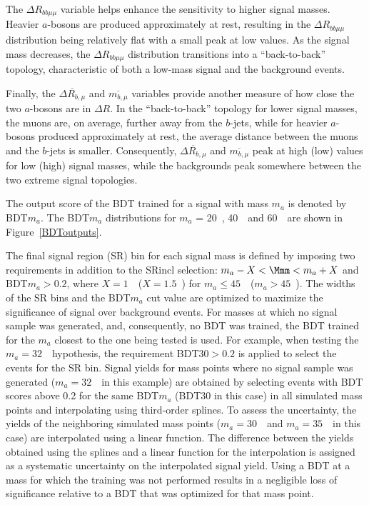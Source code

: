 \documentclass[cernpreprint, backref=false, texlive=2020, UKenglish, dvipsnames, block=none, texmf]{atlasdoc}
\begin{document}
 
The $\Delta R_{bb\mu\mu}$ variable helps enhance the sensitivity to higher signal masses. Heavier $a$-bosons are produced approximately at rest, resulting in the $\Delta R_{bb\mu\mu}$ distribution being relatively flat with a small peak at low values. As the signal mass decreases, the $\Delta R_{bb\mu\mu}$ distribution  transitions into a ``back-to-back'' topology, characteristic of both a low-mass signal and the background events.
 
 
Finally, the $\overline{\Delta R_{b,\mu}}$ and $\overline{m_{b,\mu}}$ variables provide another measure of how close the two $a$-bosons are in $\Delta R$.
In the ``back-to-back'' topology for lower signal masses, the muons are, on average, further away from the $b$-jets, while for heavier $a$-bosons produced approximately at rest, the average distance between the muons and the $b$-jets is smaller.
Consequently, $\overline{\Delta R_{b,\mu}}$ and $\overline{m_{b,\mu}}$ peak at high (low) values for low (high) signal masses, while the backgrounds peak somewhere between the two extreme signal topologies.
 
The output score of the BDT trained for a signal with mass $m_a$ is denoted by BDT$m_a$. The BDT$m_a$ distributions for $m_a$ = 20~\GeV, 40~\GeV\, and 60~\GeV\ are shown in Figure~\ref{BDToutputs}.
 
The final signal region (SR) bin for each signal mass is defined by imposing two requirements in addition to the SRincl selection: $m_a-X<\Mmm<m_a+X$ and  BDT$m_a>0.2$, where $X=1$~\GeV\ ($X=1.5$~\GeV) for $m_a\leq 45$~\GeV\ ($m_a>45$~\GeV). The widths of the SR bins and the BDT$m_a$ cut value are optimized to maximize the significance of signal over background events.
For masses at which no signal sample was generated, and, consequently, no BDT was trained, the BDT trained for the $m_a$ closest to the one being tested is used.
For example, when testing the  $m_a=32$~\GeV\ hypothesis, the requirement BDT$30>0.2$ is applied to select the events for the SR bin.
Signal yields for mass points where no signal sample was generated ($m_a=32$~\GeV\ in this example) are obtained by selecting events with BDT scores above 0.2 for the same BDT$m_a$ (BDT30 in this case) in all simulated mass points and interpolating using third-order splines.
To assess the uncertainty, the yields of the neighboring simulated mass points ($m_a=30$~\GeV\ and $m_a=35$~\GeV\ in this case) are interpolated using a linear function. The difference between the yields obtained using the splines and a linear function for the interpolation is assigned as a systematic uncertainty on the interpolated signal yield.
Using a BDT at a mass for which the training was not performed results in a negligible loss of significance relative to a BDT that was optimized for that mass point.
 
\end{document}
